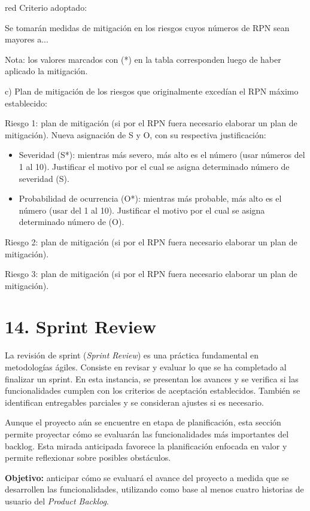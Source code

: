 \documentclass[
11pt, %
codirector, %
]{charter}
\begin{document}
\begin{consigna}{red}
Criterio adoptado: 

Se tomarán medidas de mitigación en los riesgos cuyos números de RPN sean mayores a...

Nota: los valores marcados con (*) en la tabla corresponden luego de haber aplicado la mitigación.

c) Plan de mitigación de los riesgos que originalmente excedían el RPN máximo establecido:
 
Riesgo 1: plan de mitigación (si por el RPN fuera necesario elaborar un plan de mitigación).
  Nueva asignación de S y O, con su respectiva justificación:
  \begin{itemize}
	\item Severidad (S*): mientras más severo, más alto es el número (usar números del 1 al 10).
          Justificar el motivo por el cual se asigna determinado número de severidad (S).
	\item Probabilidad de ocurrencia (O*): mientras más probable, más alto es el número (usar del 1 al 10).
          Justificar el motivo por el cual se asigna determinado número de (O).
	\end{itemize}

Riesgo 2: plan de mitigación (si por el RPN fuera necesario elaborar un plan de mitigación).
 
Riesgo 3: plan de mitigación (si por el RPN fuera necesario elaborar un plan de mitigación).

\end{consigna}

\section{14. Sprint Review}
\label{sec:sprint_review}

La revisión de sprint (\emph{Sprint Review}) es una práctica fundamental en metodologías ágiles. Consiste en revisar y evaluar lo que se ha completado al finalizar un sprint. En esta instancia, se presentan los avances y se verifica si las funcionalidades cumplen con los criterios de aceptación establecidos. También se identifican entregables parciales y se consideran ajustes si es necesario.

Aunque el proyecto aún se encuentre en etapa de planificación, esta sección permite proyectar cómo se evaluarán las funcionalidades más importantes del backlog. Esta mirada anticipada favorece la planificación enfocada en valor y permite reflexionar sobre posibles obstáculos.

\textbf{Objetivo:} anticipar cómo se evaluará el avance del proyecto a medida que se desarrollen las funcionalidades, utilizando como base al menos cuatro historias de usuario del \emph{Product Backlog}.
\end{document}

